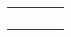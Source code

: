 \documentclass{article}
\begin{document}
\begin{tabular}{ |p{4cm}|p{5.5cm}|p{6cm}|p{3.5cm}|  }
                                                                             &  %
                                                                             \\ %
\hline
                                                                             &  %
                                                                             &  %
                                                                             &  %
                                                                             \\ %
\hline
                                                                             &  %
                                                                             &  %
                                                                             &  %
                                                                             \\ %
\hline
                                                                             &  %
                                                                             &  %
                                                                             &  %
                                                                             \\ %
\hline
                                                                             &  %
                                                                             &  %
                                                                             &  %
                                                                             \\ %
\hline
\end{tabular}

\newpage
\end{document}

